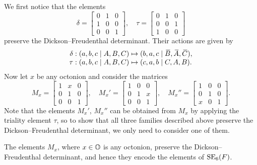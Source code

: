 We first notice that the elements 
\begin{equation}
	\label{eq:delta_tau}
	\delta = \begin{bmatrix}
		0 & 1 & 0 \\
		1 & 0 & 0 \\
		0 & 0 & 1
	\end{bmatrix},\quad 
	\tau = \begin{bmatrix}
		0 & 1 & 0 \\
		0 & 0 & 1 \\
		1 & 0 & 0
	\end{bmatrix}
\end{equation}
preserve the Dickson--Freudenthal determinant. Their actions are given by
\begin{equation}
	\begin{array}{r@{\;}c@{\;}l}
		\delta: (a,b,c\mid A,B,C) & \mapsto & (b,a,c\mid \ovB, \ovA, \ovC), \\
		\tau: (a,b,c\mid A,B,C) & \mapsto & (c,a,b\mid C,A,B). 
	\end{array}
\end{equation}
Now let $x$ be any octonion and consider the matrices
\begin{equation}
	M_x = \begin{bmatrix}
		1 & x & 0 \\
		0 & 1 & 0 \\
		0 & 0 & 1 
	\end{bmatrix},\quad 
	M_x' = \begin{bmatrix}
		1 & 0 & 0 \\
		0 & 1 & x \\
		0 & 0 & 1
	\end{bmatrix},\quad 
	M_x'' = \begin{bmatrix}
		1 & 0 & 0 \\
		0 & 1 & 0 \\
		x & 0 & 1
	\end{bmatrix}.
\end{equation}
Note that the elements $M_x'$, $M_x''$ can be obtained from $M_x$ by applying 
the triality element $\tau$, so to show that all three families described above preserve
the Dickson--Freudenthal determinant, we only need to consider one of them. 

\begin{lemma}
	\label{lemma:Mx_det}
	The elements $M_x$, where $x \in \mathbb{O}$ is any octonion, preserve the Dickson--Freudenthal
	determinant, and hence they encode the elements of $\mathrm{SE}_6(F)$. 
\end{lemma} 


